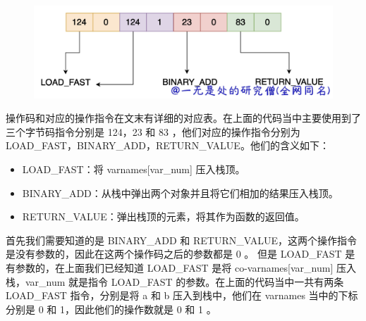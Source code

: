     \begin{figure}[H]
        \centering
            \includegraphics[scale=.25]{images/46-bytecode.png}
						\caption{ }
        \label{fig:my_label}
    \end{figure}

操作码和对应的操作指令在文末有详细的对应表。在上面的代码当中主要使用到了三个字节码指令分别是 124，23 和 83 ，他们对应的操作指令分别为 LOAD\_FAST，BINARY\_ADD，RETURN\_VALUE。他们的含义如下：
\begin{itemize}
\item LOAD\_FAST：将 varnames[var\_num] 压入栈顶。
\item BINARY\_ADD：从栈中弹出两个对象并且将它们相加的结果压入栈顶。
\item RETURN\_VALUE：弹出栈顶的元素，将其作为函数的返回值。
\end{itemize}
首先我们需要知道的是 BINARY\_ADD 和 RETURN\_VALUE，这两个操作指令是没有参数的，因此在这两个操作码之后的参数都是 0 。
但是 LOAD\_FAST 是有参数的，在上面我们已经知道 LOAD\_FAST 是将 co-varnames[var\_num] 压入栈，var\_num 就是指令 LOAD\_FAST 的参数。在上面的代码当中一共有两条 LOAD\_FAST 指令，分别是将 a 和 b 压入到栈中，他们在 varnames 当中的下标分别是 0 和 1，因此他们的操作数就是 0 和 1 。
